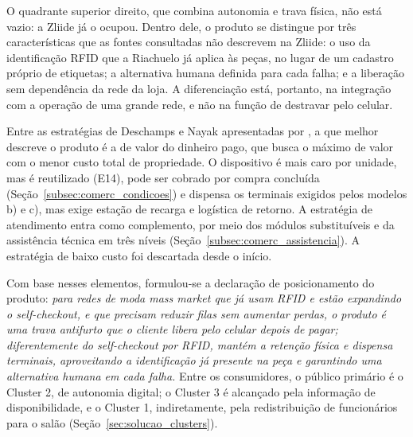 \begin{figure}[htbp]
\end{figure}

O quadrante superior direito, que combina autonomia e trava física, não está vazio: a Zliide já o ocupou. Dentro dele, o produto se distingue por três características que as fontes consultadas não descrevem na Zliide: o uso da identificação RFID que a Riachuelo já aplica às peças, no lugar de um cadastro próprio de etiquetas; a alternativa humana definida para cada falha; e a liberação sem dependência da rede da loja. A diferenciação está, portanto, na integração com a operação de uma grande rede, e não na função de destravar pelo celular.

Entre as estratégias de Deschamps e Nayak apresentadas por , a que melhor descreve o produto é a de valor do dinheiro pago, que busca o máximo de valor com o menor custo total de propriedade. O dispositivo é mais caro por unidade, mas é reutilizado (E14), pode ser cobrado por compra concluída (Seção~\ref{subsec:comerc_condicoes}) e dispensa os terminais exigidos pelos modelos b) e c), mas exige estação de recarga e logística de retorno. A estratégia de atendimento entra como complemento, por meio dos módulos substituíveis e da assistência técnica em três níveis (Seção~\ref{subsec:comerc_assistencia}). A estratégia de baixo custo foi descartada desde o início.

Com base nesses elementos, formulou-se a declaração de posicionamento do produto: \textit{para redes de moda mass market que já usam RFID e estão expandindo o self-checkout, e que precisam reduzir filas sem aumentar perdas, o produto é uma trava antifurto que o cliente libera pelo celular depois de pagar; diferentemente do self-checkout por RFID, mantém a retenção física e dispensa terminais, aproveitando a identificação já presente na peça e garantindo uma alternativa humana em cada falha.} Entre os consumidores, o público primário é o Cluster 2, de autonomia digital; o Cluster 3 é alcançado pela informação de disponibilidade, e o Cluster 1, indiretamente, pela redistribuição de funcionários para o salão (Seção~\ref{sec:solucao_clusters}).

